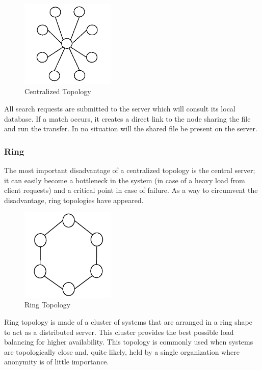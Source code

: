 \begin{figure}
  \centering
  \includegraphics[width=0.4\textwidth]{src/img/p2p-systems/centralized}
  \caption{Centralized Topology}
  \label{fig:p2p-systems:centralized}
\end{figure}

All search requests are submitted to the server which will consult its local
database. If a match occurs, it creates a direct link to the node sharing the
file and run the transfer. In no situation will the shared file be present on
the server.

\subsubsection{Ring}

The most important disadvantage of a centralized topology is the central
server; it can easily become a bottleneck in the system (in case of a heavy
load from client requests) and a critical point in case of failure. As a way
to circumvent the disadvantage, ring topologies have appeared.

\begin{figure}
  \centering
  \includegraphics[width=0.4\textwidth]{src/img/p2p-systems/ring}
  \caption{Ring Topology}
  \label{fig:p2p-systems:ring}
\end{figure}

Ring topology is made of a cluster of systems that are arranged in a ring shape
to act as a distributed server. This cluster provides the best possible load
balancing for higher availability. This topology is commonly used when systems
are topologically close and, quite likely, held by a single organization where
anonymity is of little importance.

